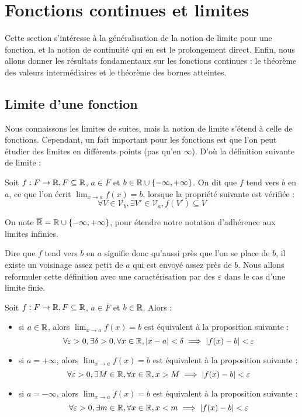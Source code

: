 \section{Fonctions continues et limites}

Cette section s'intéresse à la généralisation de la notion de limite pour une fonction, et la notion de continuité qui en est le prolongement direct. Enfin, nous allons donner les résultats fondamentaux sur les fonctions continues : le théorème des valeurs intermédiaires et le théorème des bornes atteintes.

\subsection{Limite d'une fonction}

Nous connaissons les limites de suites, mais la notion de limite s'étend à celle de fonctions. Cependant, un fait important pour les fonctions est que l'on peut étudier des limites en différents points (pas qu'en $\infty$). D'où la définition suivante de limite :

\begin{defi}
    Soit $f : F\to\mathbb{R}, F\subseteq\mathbb{R}$, $a\in\overline F$ et $b\in\mathbb{R}\cup\{-\infty,+\infty\}$. On dit que $f$ tend vers $b$ en $a$, ce que l'on écrit $\displaystyle{\lim_{x\to a} f(x) = b}$, lorsque la propriété suivante est vérifiée : $$\forall V\in \mathcal V_{b},\exists V'\in\mathcal V_a, f(V')\subseteq V$$
\end{defi}

\begin{rmk}
    On note $\overline{\mathbb{R}} = \mathbb{R}\cup\{-\infty,+\infty\}$, pour étendre notre notation d'adhérence aux limites infinies.
\end{rmk}

Dire que $f$ tend vers $b$ en $a$ signifie donc qu'aussi près que l'on se place de $b$, il existe un voisinage assez petit de $a$ qui est envoyé assez près de $b$. Nous allons reformuler cette définition avec une caractérisation par des $\varepsilon$ dans le cas d'une limite finie.

\begin{prop}
    Soit $f : F\to\mathbb{R},F\subseteq \mathbb{R}$, $a\in\overline F$ et $b\in \mathbb{R}$. Alors :
    \begin{itemize}[label=$\bullet$]
        \item si $a \in\mathbb{R}$, alors $\displaystyle{\lim_{x\to a} f(x) = b}$ est équivalent à la proposition suivante : $$\forall \varepsilon > 0, \exists \delta > 0, \forall x\in\mathbb{R}, |x-a| < \delta \implies |f(x)-b| < \varepsilon$$
        \item si $a = +\infty$, alors $\displaystyle{\lim_{x\to a} f(x) = b}$ est équivalent à la proposition suivante : $$\forall \varepsilon > 0, \exists M \in\mathbb{R}, \forall x\in\mathbb{R}, x > M \implies |f(x)-b| < \varepsilon$$
        \item si $a = -\infty$, alors $\displaystyle{\lim_{x\to a} f(x) = b}$ est équivalent à la proposition suivante : $$\forall \varepsilon > 0, \exists m \in \mathbb{R}, \forall x\in\mathbb{R}, x < m \implies |f(x)-b| < \varepsilon$$
    \end{itemize}
\end{prop}

